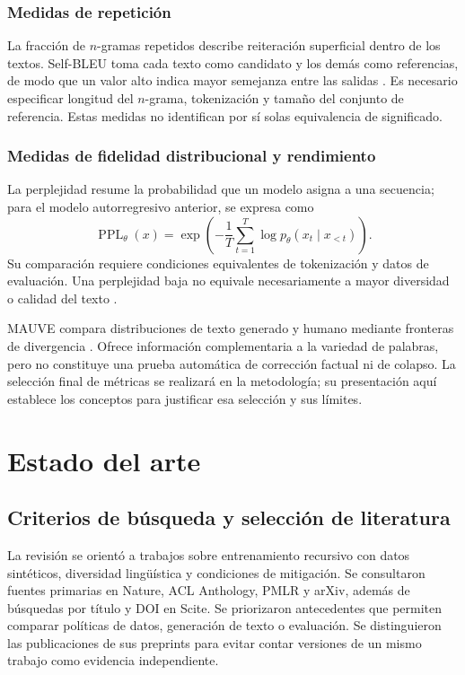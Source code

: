 \documentclass[12pt,letterpaper]{article}
\begin{document}
\subsubsection{Medidas de repetición}

La fracción de \(n\)-gramas repetidos describe reiteración superficial
dentro de los textos. Self-BLEU toma cada texto como candidato y los demás
como referencias, de modo que un valor alto indica mayor semejanza entre
las salidas \cite{zhu2018texygen}. Es necesario especificar longitud del
\(n\)-grama, tokenización y tamaño del conjunto de referencia. Estas
medidas no identifican por sí solas equivalencia de significado.

\subsubsection{Medidas de fidelidad distribucional y rendimiento}

La perplejidad resume la probabilidad que un modelo asigna a una secuencia;
para el modelo autorregresivo anterior, se expresa como
\begin{equation}
    \operatorname{PPL}_{\theta}(x)
    =\exp\left(-\frac{1}{T}\sum_{t=1}^{T}
    \log p_{\theta}(x_t\mid x_{<t})\right).
\end{equation}
Su comparación requiere condiciones equivalentes de tokenización y datos
de evaluación. Una perplejidad baja no equivale necesariamente a mayor
diversidad o calidad del texto \cite{guo2024}.

MAUVE compara distribuciones de texto generado y humano mediante fronteras
de divergencia \cite{pillutla2021}. Ofrece información complementaria a
la variedad de palabras, pero no constituye una prueba automática de
corrección factual ni de colapso. La selección final de métricas se
realizará en la metodología; su presentación aquí establece los conceptos
para justificar esa selección y sus límites.

\section{Estado del arte}

\subsection{Criterios de búsqueda y selección de literatura}

La revisión se orientó a trabajos sobre entrenamiento recursivo con datos
sintéticos, diversidad lingüística y condiciones de mitigación. Se
consultaron fuentes primarias en Nature, ACL Anthology, PMLR y arXiv,
además de búsquedas por título y DOI en Scite. Se priorizaron antecedentes
que permiten comparar políticas de datos, generación de texto o evaluación.
Se distinguieron las publicaciones de sus preprints para evitar contar
versiones de un mismo trabajo como evidencia independiente.
\end{document}
